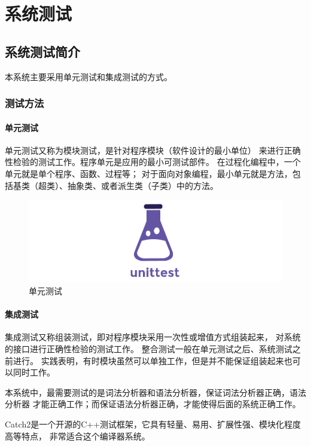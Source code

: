 \section{系统测试}
\subsection{系统测试简介}

本系统主要采用单元测试和集成测试的方式。

\subsubsection{测试方法}

\paragraph{单元测试}

单元测试又称为模块测试，是针对程序模块（软件设计的最小单位）
来进行正确性检验的测试工作。程序单元是应用的最小可测试部件。
在过程化编程中，一个单元就是单个程序、函数、过程等；
对于面向对象编程，最小单元就是方法，包括基类（超类）、抽象类、或者派生类（子类）中的方法。

\begin{figure}[hbt]
	\includegraphics[scale=.5]{unittest.png}
	\caption{单元测试}
\end{figure}

\paragraph{集成测试}
集成测试又称组装测试，即对程序模块采用一次性或增值方式组装起来，
对系统的接口进行正确性检验的测试工作。
整合测试一般在单元测试之后、系统测试之前进行。
实践表明，有时模块虽然可以单独工作，但是并不能保证组装起来也可以同时工作。

本系统中，最需要测试的是词法分析器和语法分析器，保证词法分析器正确，语法分析器
才能正确工作；而保证语法分析器正确，才能使得后面的系统正确工作。

Catch2是一个开源的C++测试框架，它具有轻量、易用、扩展性强、模块化程度高等特点，
非常适合这个编译器系统。

